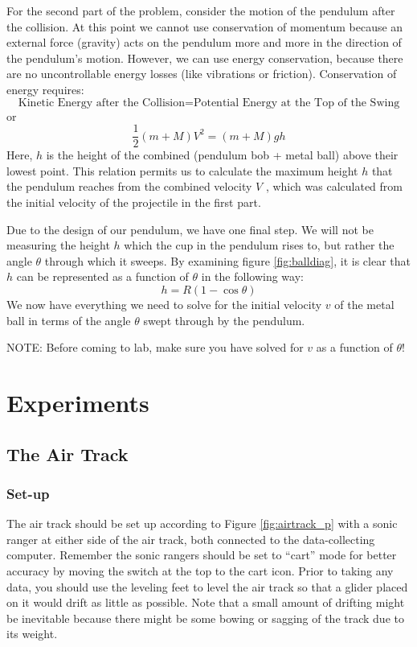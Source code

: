 For the second part of the problem, consider the motion of the pendulum after the collision. At this point we cannot use conservation of momentum because an external force (gravity) acts on the pendulum more and more in the direction of the pendulum's motion.  However, we can use energy conservation, because there are no uncontrollable energy losses (like vibrations or friction). Conservation of energy requires:
\begin{equation}
    \text{Kinetic Energy after the Collision} = \text{Potential Energy at the Top of the Swing}
\end{equation}
or
\begin{equation}
    \frac{1}{2}(m+M)V^2 = (m+M)gh
\end{equation}
Here, $h$ is the height of the combined (pendulum bob + metal ball) above their lowest point.  This relation permits us to calculate the maximum height $h$ that the pendulum reaches from the combined velocity $V$ , which was calculated from the initial velocity of the projectile in the first part.\myskip

Due to the design of our pendulum, we have one final step.  We will not be measuring the height $h$ which the cup in the pendulum rises to, but rather the angle $\theta$ through which it sweeps.  By examining figure \ref{fig:balldiag}, it is clear that $h$ can be represented as a function of $\theta$ in the following way:
\begin{equation}
    h = R(1-\cos\theta)
\end{equation}
We now have everything we need to solve for the initial velocity $v$ of the metal ball in terms of the angle $\theta$ swept through by the pendulum.\myskip

NOTE: Before coming to lab, make sure you have solved for $v$ as a function of $\theta$!

\section{Experiments}
\subsection{The Air Track}

\subsubsection{Set-up}

The air track should be set up according to Figure \ref{fig:airtrack_p} with a sonic ranger at either side of the air track, both connected to the data-collecting computer. Remember the sonic rangers should be set to ``cart'' mode for better accuracy by moving the switch at the top to the cart icon. Prior to taking any data, you should use the leveling feet to level the air track so that a glider placed on it would drift as little as possible. Note that a small amount of drifting might be inevitable because there might be some bowing or sagging of the track due to its weight.\myskip

